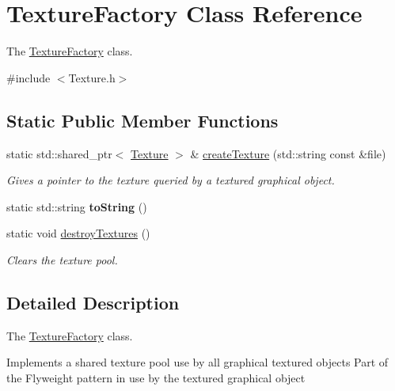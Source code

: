 \hypertarget{classTextureFactory}{}\section{Texture\+Factory Class Reference}
\label{classTextureFactory}


The \hyperlink{classTextureFactory}{Texture\+Factory} class.  




{\ttfamily \#include $<$Texture.\+h$>$}

\subsection*{Static Public Member Functions}
\begin{DoxyCompactItemize}
\item 
static std\+::shared\+\_\+ptr$<$ \hyperlink{classTexture}{Texture} $>$ \& \hyperlink{classTextureFactory_a3326fe1ffdcb4c3660ca127f3d87aee2}{create\+Texture} (std\+::string const \&file)
\begin{DoxyCompactList}\small\item\em Gives a pointer to the texture queried by a textured graphical object. \end{DoxyCompactList}\item 
\hypertarget{classTextureFactory_a9ded2336698fbf1a38656d48c527838d}{}static std\+::string {\bfseries to\+String} ()\label{classTextureFactory_a9ded2336698fbf1a38656d48c527838d}

\item 
\hypertarget{classTextureFactory_abb1949776510f478f2bf3203d90d489f}{}static void \hyperlink{classTextureFactory_abb1949776510f478f2bf3203d90d489f}{destroy\+Textures} ()\label{classTextureFactory_abb1949776510f478f2bf3203d90d489f}

\begin{DoxyCompactList}\small\item\em Clears the texture pool. \end{DoxyCompactList}\end{DoxyCompactItemize}


\subsection{Detailed Description}
The \hyperlink{classTextureFactory}{Texture\+Factory} class. 

Implements a shared texture pool use by all graphical textured objects Part of the Flyweight pattern in use by the textured graphical object 

